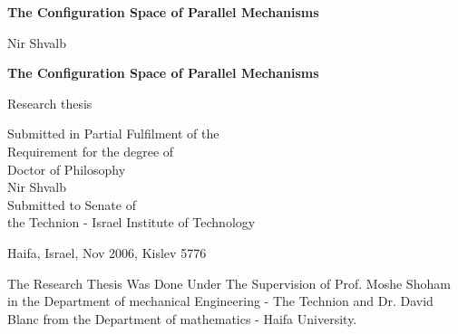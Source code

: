 \pagestyle{empty} %
\begin{center}
\vspace*{2.0cm} \Huge {\bf \Huge The Configuration Space of
Parallel Mechanisms}


\vspace*{6.0cm} \Large
Nir Shvalb\\
\end{center}
\newpage
\begin{center}
\Huge {\bf \Huge The Configuration Space of Parallel Mechanisms}

\vspace*{1.5cm} \Large
 Research thesis

\vspace*{1.5cm} \Large
Submitted in Partial Fulfilment of the \\
Requirement for the degree of \\
Doctor of Philosophy \\
\vspace*{3.0cm} \Large
Nir Shvalb\\



\vspace*{2.0cm} \Large
Submitted to Senate of\\
the Technion - Israel Institute of Technology\\

\end{center}
\begin{center} \vspace*{.5cm} Haifa, Israel, Nov 2006, Kislev 5776
\end{center}
\newpage


\pagestyle{plain} %

%
The Research Thesis Was Done Under The Supervision of Prof. Moshe
Shoham in the Department of mechanical Engineering - The Technion
and Dr. David Blanc from the Department of mathematics - Haifa
University.

\tableofcontents
\listofnotations
\listoffigures
{}
\newpage


